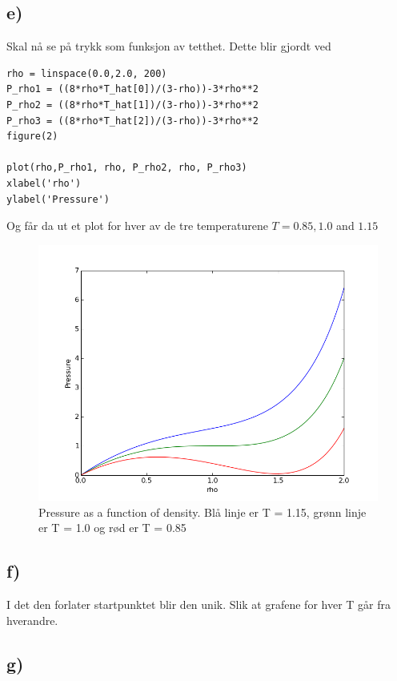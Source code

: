 \documentclass[12pt]{article}
\begin{document}
\subsection*{e)}

Skal nå se på trykk som funksjon av tetthet. Dette blir gjordt ved

\begin{lstlisting}
rho = linspace(0.0,2.0, 200)
P_rho1 = ((8*rho*T_hat[0])/(3-rho))-3*rho**2
P_rho2 = ((8*rho*T_hat[1])/(3-rho))-3*rho**2
P_rho3 = ((8*rho*T_hat[2])/(3-rho))-3*rho**2
figure(2)

plot(rho,P_rho1, rho, P_rho2, rho, P_rho3)
xlabel('rho')
ylabel('Pressure')
\end{lstlisting}

Og får da ut et plot for hver av de tre temperaturene $ T = 0.85, 1.0$ and $1.15$
\begin{figure}[ht!]
\includegraphics[width = \textwidth]{figure_2.png}
\caption{Pressure as a function of density. Blå linje er T = 1.15, grønn linje er T = 1.0 og rød er T = 0.85}
\label{fig:2}
\end{figure}

\subsection*{f)}

I det den forlater startpunktet blir den unik. Slik at grafene for hver T går fra hverandre. 

\subsection*{g)}
\end{document}
